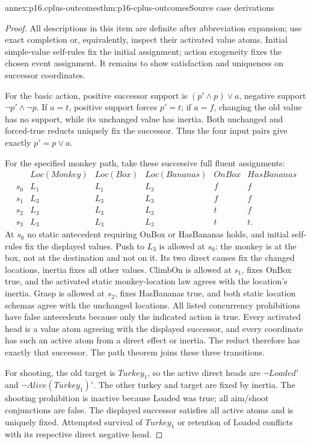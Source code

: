 \begin{annexitem}{annex:p16.cplus-outcomes}{thm:p16-cplus-outcomes}{Source case derivations}
\begin{proof}
All descriptions in this item are definite after abbreviation expansion;
use exact completion or, equivalently, inspect their activated value
atoms. Initial simple-value self-rules fix the initial assignment;
action exogeneity fixes the chosen event assignment. It remains to
show satisfaction and uniqueness on successor coordinates.

For the basic action, positive successor support is
\((p'\land p)\lor a\), negative support \(\neg p'\land\neg p\).
If \(a=t\), positive support forces \(p'=t\); if \(a=f\), changing
the old value has no support, while its unchanged value has inertia.
Both unchanged and forced-true reducts uniquely fix the successor.
Thus the four input pairs give exactly \(p'=p\lor a\).

For the specified monkey path, take these successive full fluent
assignments:
\[
\begin{array}{c|ccc|cc}
 &Loc(Monkey)&Loc(Box)&Loc(Bananas)&OnBox&HasBananas\\ \hline
 s_0&L_1&L_1&L_3&f&f\\
 s_1&L_3&L_3&L_3&f&f\\
 s_2&L_3&L_3&L_3&t&f\\
 s_3&L_3&L_3&L_3&t&t.
\end{array}
\]
At \(s_0\) no static antecedent requiring OnBox or HasBananas holds,
and initial self-rules fix the displayed values.
Push to \(L_3\) is allowed at \(s_0\): the monkey is at the box,
not at the destination and not on it. Its two direct causes fix the
changed locations, inertia fixes all other values.
ClimbOn is allowed at \(s_1\), fixes OnBox true, and the activated
static monkey-location law agrees with the location's inertia.
Grasp is allowed at \(s_2\), fixes HasBananas true, and both static
location schemas agree with the unchanged locations.
All listed concurrency prohibitions have false antecedents because
only the indicated action is true. Every activated head is a value
atom agreeing with the displayed successor, and every coordinate
has such an active atom from a direct effect or inertia.
The reduct therefore has exactly that successor.
The path theorem joins these three transitions.

For shooting, the old target is \(Turkey_1\), so the active direct heads
are \(\neg Loaded'\) and \(\neg Alive(Turkey_1)'\).
The other turkey and target are fixed by inertia.
The shooting prohibition is inactive because Loaded was true;
all aim/shoot conjunctions are false. The displayed successor
satisfies all active atoms and is uniquely fixed.
Attempted survival of \(Turkey_1\) or retention of Loaded conflicts with
its respective direct negative head.


\end{proof}
\end{annexitem}
